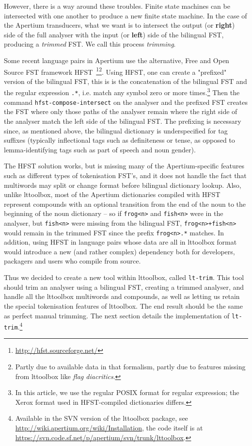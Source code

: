 \documentclass[10pt, a4paper]{article}
\newcommand{\ana}[1]{\texttt{#1}}
\newcommand{\tool}[1]{\texttt{#1}}
\begin{document}
However, there is a way around these troubles. Finite state machines
can be intersected with one another to produce a new finite state
machine. In the case of the Apertium transducers, what we want is to
intersect the output (or \textbf{right}) side of the full analyser
with the input (or \textbf{left}) side of the bilingual FST, producing
a \emph{trimmed} FST. We call this process \emph{trimming}.

Some recent language pairs in Apertium use the alternative, Free and
Open Source FST framework
HFST~\cite{linden2011hfst}\footnote{\url{http://hfst.sourceforge.net/}}\footnote{Partly
  due to available data in that formalism, partly due to features
  missing from lttoolbox like \emph{flag diacritics}.}. Using HFST,
one can create a "prefixed" version of the bilingual FST, this is is
the concatenation of the bilingual FST and the regular expression
\ana{.*}, i.e. match any symbol zero or more times.\footnote{In this
  article, we use the regular POSIX format for regular expression; the
  Xerox format used in HFST-compiled dictionaries differs.} Then the
command \tool{hfst-compose-intersect} on the analyser and the prefixed
FST creates the FST where only those paths of the analyser remain
where the right side of the analyser match the left side of the
bilingual FST. The prefixing is necessary since, as mentioned above,
the bilingual dictionary is underspecified for tag suffixes (typically
inflectional tags such as definiteness or tense, as opposed to
lemma-identifying tags such as part of speech and noun gender).

The HFST solution works, but is missing many of the Apertium-specific
features such as different types of tokenisation FST's, and it does
not handle the fact that multiwords may split or change format before
bilingual dictionary lookup. Also, unlike lttoolbox, most of the
Apertium dictionaries compiled with HFST represent compounds with an
optional transition from the end of the noun to the beginning of the
noun dictionary -- so if \ana{frog<n>} and \ana{fish<n>} were in the
analyser, but \ana{fish<n>} were missing from the bilingual FST,
\ana{frog<n>+fish<n>} would remain in the trimmed FST since the prefix
\ana{frog<n>.*} matches. In addition, using HFST in language pairs
whose data are all in lttoolbox format would introduce a new (and
rather complex) dependency both for developers, packagers and users
who compile from source.

Thus we decided to create a new tool within lttoolbox, called
\tool{lt-trim}. This tool should trim an analyser using a bilingual
FST, creating a trimmed analyser, and handle all the lttoolbox
multiwords and compounds, as well as letting us retain the special
tokenisation features of lttoolbox. The end result should be the same
as perfect manual trimming. The next section details the
implementation of \tool{lt-trim}.\footnote{Available in the SVN
  version of the lttoolbox package, see
  \url{http://wiki.apertium.org/wiki/Installation},
  the code itself is at
  \url{https://svn.code.sf.net/p/apertium/svn/trunk/lttoolbox}.}
\end{document}
